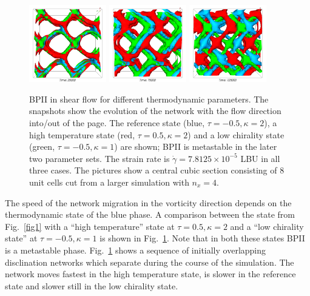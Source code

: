 \documentclass[12pt,twoside]{iopart}
\newcommand{\ex}[1]{\times10^{#1}}
\begin{document}
\begin{figure}[t]
\centering
\includegraphics[width=0.3\textwidth]{disc_bp2_tk_scan_25k.png}
\includegraphics[width=0.3\textwidth]{disc_bp2_tk_scan_75k.png}
\includegraphics[width=0.3\textwidth]{disc_bp2_tk_scan_125k.png}
\caption{BPII in shear flow for different thermodynamic parameters. The
snapshots show the evolution of the network with the flow direction into/out of
the page.  The reference state (blue, $\tau=-0.5, \kappa=2$), a high
temperature state (red, $\tau=0.5, \kappa=2$) and a low chirality state
(green, $\tau=-0.5, \kappa=1$) are shown; BPII is metastable in the later
two parameter sets.
The strain rate is $\dot{\gamma}=7.8125\ex{-5}$ LBU in all three cases.
The pictures show a central cubic section consisting of 8 unit cells cut
from a larger simulation with $n_x=4$.}
\label{fig2}
\end{figure}

The speed of the network migration in the vorticity direction depends on the
thermodynamic state of the blue phase.
A comparison between the state from Fig.~\ref{fig1} with a
``high temperature'' state at $\tau=0.5, \kappa=2$ and a
``low chirality state'' at $\tau=-0.5, \kappa=1$ is shown in
Fig.~\ref{fig2}. Note that in both these states BPII is a metastable phase. 
Fig.~\ref{fig2} shows a sequence of initially overlapping
disclination networks which separate during the course of the simulation.
The network moves fastest in the high temperature state, is slower in the
reference state and slower still in the low chirality state.
\end{document}
